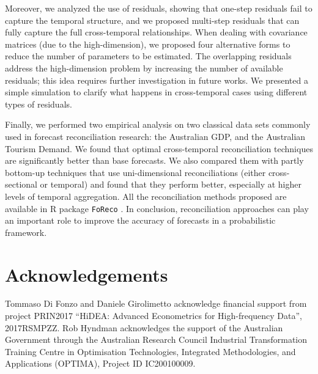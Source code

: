 \documentclass[a4paper,11pt]{article}
\theoremstyle{definition}
\begin{document}
Moreover, we analyzed the use of residuals, showing that one-step residuals fail to capture the temporal structure, and we proposed multi-step residuals that can fully capture the full cross-temporal relationships. When dealing with covariance matrices (due to the high-dimension), we proposed four alternative forms to reduce the number of parameters to be estimated. The overlapping residuals address the high-dimension problem by increasing the number of available residuals; this idea requires further investigation in future works. We presented a simple simulation to clarify what happens in cross-temporal cases using different types of residuals.%

Finally, we performed two empirical analysis on two classical data sets commonly used in forecast reconciliation research: the Australian GDP, and the Australian Tourism Demand. We found that optimal cross-temporal reconciliation techniques are significantly better than base forecasts. We also compared them with partly bottom-up techniques that use uni-dimensional reconciliations (either cross-sectional or temporal) and found that they perform better, especially at higher levels of temporal aggregation. All the reconciliation methods proposed are available in R package \texttt{FoReco} \citep{foreco2023}. In conclusion, reconciliation approaches can play an important role to improve the accuracy of forecasts in a probabilistic framework.

\section*{Acknowledgements}

\noindent Tommaso Di Fonzo and Daniele Girolimetto acknowledge financial support from project PRIN2017 “HiDEA: Advanced Econometrics for High-frequency Data”, 2017RSMPZZ. Rob Hyndman acknowledges the support of the Australian Government through the Australian Research Council Industrial Transformation Training Centre in Optimisation Technologies, Integrated Methodologies, and Applications (OPTIMA), Project ID IC200100009.





\clearpage

\appendix
\setcounter{table}{0}
\renewcommand{\thetable}{\Alph{section}.\arabic{table}}
%
\end{document}
